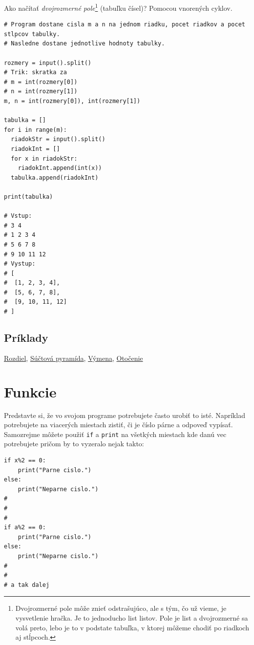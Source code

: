 \documentclass{article}
\begin{document}
Ako načítať \textit{dvojrozmerné pole}\footnote{Dvojrozmerné pole môže znieť odstrašujúco, ale s tým, čo už vieme, je vysvetlenie hračka. Je to jednoducho list listov. Pole je list a dvojrozmerné sa volá preto, lebo je to v podstate tabuľka, v ktorej môžeme chodiť po riadkoch aj stĺpcoch.} (tabuľku čísel)? Pomocou vnorených cyklov.
\begin{lstlisting}
# Program dostane cisla m a n na jednom riadku, pocet riadkov a pocet stlpcov tabulky.
# Nasledne dostane jednotlive hodnoty tabulky.

rozmery = input().split()
# Trik: skratka za
# m = int(rozmery[0])
# n = int(rozmery[1])
m, n = int(rozmery[0]), int(rozmery[1])

tabulka = []
for i in range(m):
  riadokStr = input().split()
  riadokInt = []
  for x in riadokStr:
    riadokInt.append(int(x))
  tabulka.append(riadokInt)

print(tabulka)

# Vstup:
# 3 4
# 1 2 3 4
# 5 6 7 8
# 9 10 11 12
# Vystup:
# [
#  [1, 2, 3, 4],
#  [5, 6, 7, 8],
#  [9, 10, 11, 12]
# ]
\end{lstlisting}

\subsection{Príklady}
\href{https://testovac.ksp.sk/tasks/ls-uvod-rozdiel/}{Rozdiel},
\href{https://testovac.ksp.sk/tasks/ls-uvod-suctovapyramida/}{Súčtová pyramída},
\href{https://testovac.ksp.sk/tasks/ls-uvod-vymena/}{Výmena},
\href{https://testovac.ksp.sk/tasks/ls-uvod-otocenie/}{Otočenie}

\section{Funkcie}

Predstavte si, že vo svojom programe potrebujete často urobiť to isté. Napríklad potrebujete na viacerých miestach zistiť, či je číslo párne a odpoveď vypísať. Samozrejme môžete použiť \texttt{if} a \texttt{print} na všetkých miestach kde danú vec potrebujete pričom by to vyzeralo nejak takto:

\begin{lstlisting}
if x%2 == 0:
    print("Parne cislo.")
else:
    print("Neparne cislo.")
#   
#
#
if a%2 == 0:
    print("Parne cislo.")
else:
    print("Neparne cislo.")
#
#
# a tak dalej
\end{lstlisting}
\end{document}
